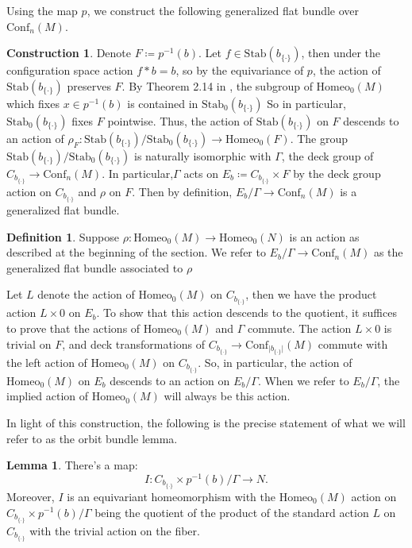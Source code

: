 \documentclass[10pt, oneside]{article}
\newcommand{\homeo}[1][S^1]{\text{Homeo}_0(#1)}
\newcommand{\conf}[2][S^1]{\text{Conf}_{#2}(#1)}
\newcommand{\set}{{\{\cdot\}}}
\newcommand{\stab}[1]{\text{Stab}(#1)}
\newcommand{\pstab}[1]{\text{Stab}_0(#1)}
\newcommand{\maxcov}{C_{b_\set}}
\theoremstyle{definition}
\newtheorem{defn}{Definition}[section]
\newtheorem*{construction*}{Construction}
\newtheorem{lem}{Lemma}[section]
\theoremstyle{definition}
\begin{document}
Using the map $p$, we construct the following generalized flat bundle over $\conf[M]{n}$.

\begin{construction*}\label{const:orbit-bundle}
    Denote $F\coloneqq p^{-1}(b)$. 
    Let $f\in\stab{b_\set}$, then under the configuration space action $f*b=b$, so by the equivariance of $p$, the action of $\stab{b_\set}$ preserves $F$.
    By Theorem 2.14 in \cite{chen_structure_2023}, the subgroup of $\homeo[M]$ which fixes $x\in p^{-1}(b)$ is contained in $\pstab{b_\set}$
    So in particular, $\pstab{b_\set}$ fixes $F$ pointwise. 
    Thus, the action of $\stab{b_\set}$ on $F$ descends to an action of $\rho_F:\stab{b_\set}/\pstab{b_\set}\to \homeo[F]$. The group $\stab{b_\set}/\pstab{b_\set}$ is naturally isomorphic with $\Gamma$, the deck group of $C_{b_\set}\to \conf[M]{n}$. 
    In particular,$\Gamma$ acts on $E_b \coloneqq\maxcov\times F$ by the deck group action on $\maxcov$ and $\rho$ on $F$.
    Then by definition, $E_b/\Gamma\to\conf[M]{n}$ is a generalized flat bundle.

    \begin{defn}
        Suppose $\rho:\homeo[M]\to\homeo[N]$ is an action as described at the beginning of the section. We refer to $E_b/\Gamma\to\conf[M]{n}$ as the generalized flat bundle associated to $\rho$
    \end{defn}

    Let $L$ denote the action of $\homeo[M]$ on $\maxcov$, then we have the product action $L\times 0$ on $E_b$. To show that this action descends to the quotient, it suffices to prove that the actions of $\homeo[M]$ and $\Gamma$ commute. The action $L\times 0$ is trivial on $F$, and deck transformations of $\maxcov\to \conf[M]{\lvert b_{\set}\rvert}$ commute with the left action of $\homeo[M]$ on $\maxcov$. So, in particular, the action of $\homeo[M]$ on $E_b$ descends to an action on $E_b/\Gamma$. When we refer to $E_b/\Gamma$, the implied action of $\homeo[M]$ will always be this action.
\end{construction*}

In light of this construction, the following is the precise statement of what we will refer to as the orbit bundle lemma.

\begin{lem}\label{lem:orbit-bundle}
    There's a map: $$I: \maxcov \times p^{-1}(b)/ \Gamma \to N.$$ 
    Moreover, $I$ is an equivariant homeomorphism 
    with the $\homeo[M]$ action on $\maxcov \times p^{-1}(b) / \Gamma$ being the quotient of the product of the standard action $L$ on $\maxcov$ 
    with the trivial action on the fiber.
\end{lem}
\end{document}
